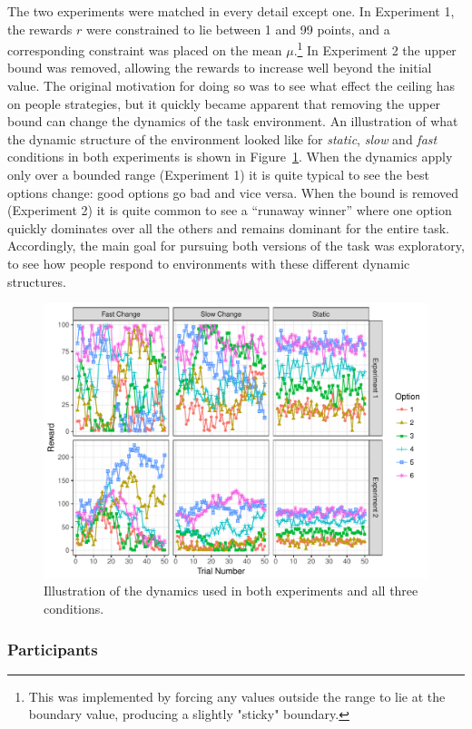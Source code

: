 \documentclass[a4paper,doc,natbib]{apa6}
\begin{document}
The two experiments were matched in every detail except one. In Experiment 1, the rewards $r$ were constrained to lie between 1 and 99 points, and a corresponding constraint was placed on the mean $\mu$.\footnote{This was implemented by forcing any values outside the range to lie at the boundary value, producing a slightly "sticky" boundary.} In Experiment 2 the upper bound was removed, allowing the rewards to increase well beyond the initial value. The original motivation for doing so was to see what effect the ceiling has on people strategies, but it quickly became apparent that removing the upper bound can change the dynamics of the task environment. An illustration of what the dynamic structure of the environment looked like for {\it static}, {\it slow} and {\it fast} conditions in both experiments is shown in Figure~\ref{fig:typicaltask}. When the dynamics apply only over a bounded range (Experiment 1) it is quite typical to see the best options change: good options go bad and vice versa. When the bound is removed (Experiment 2) it is quite common to see a ``runaway winner'' where one option quickly dominates over all the others and remains dominant for the entire task. Accordingly, the main goal for pursuing both versions of the task was exploratory, to see how people respond to environments with these different dynamic structures.

\begin{figure}[t]
\centering
\includegraphics[width=.9\textwidth]{typicaltask.pdf}
\caption{\small{Illustration of the dynamics used in both experiments and all three conditions.}}
\label{fig:typicaltask}
\end{figure}




\subsubsection{Participants}
\end{document}

